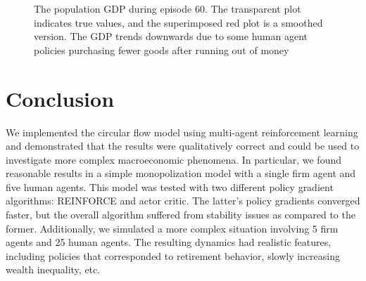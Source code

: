 \documentclass[twoside,twocolumn]{article}
\begin{document}
\begin{figure}[h]
  \caption{The population GDP during episode 60. The transparent plot indicates true values, and the superimposed red plot is a smoothed version. The GDP trends downwards due to some human agent policies purchasing fewer goods after running out of money}
  \label{plt:late-gdp}
\end{figure}


\section{Conclusion}

We implemented the circular flow model using multi-agent reinforcement learning and demonstrated that the results were qualitatively correct and could be used to investigate more complex macroeconomic phenomena. In particular, we found reasonable results in a simple monopolization model with a single firm agent and five human agents. This model was tested with two different policy gradient algorithms: REINFORCE and actor critic. The latter's policy gradients converged faster, but the overall algorithm suffered from stability issues as compared to the former. Additionally, we simulated a more complex situation involving 5 firm agents and 25 human agents. The resulting dynamics had realistic features, including policies that corresponded to retirement behavior, slowly increasing wealth inequality, etc.

\medskip 
\end{document}
